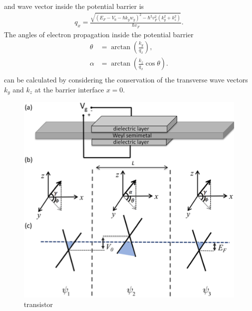     and wave vector inside the potential barrier is
    \begin{align} \label{2eq:inside wavevector}
        q_x = \frac{\sqrt{(E_F-V_0-\hbar k_y w_y)^2 - \hbar^2 v_F^2 (k_y^2 + k_z^2)}}{\hbar v_F}.
    \end{align}
    The angles of electron propagation inside the potential barrier 
    \begin{equation} \label{2eq:angles}
        \begin{aligned}
            \theta &= \arctan{\left(\frac{k_y}{q_x}\right)},\\
            \alpha &= \arctan{\left(\frac{k_z}{q_x} \cos{\theta}\right)}.\\
        \end{aligned}
    \end{equation}
    can be calculated by considering the conservation of the transverse wave vectors $k_y$ and $k_z$ at the barrier interface $x = 0$. 
    \begin{figure}[H]
        \centering
        \includegraphics[width = 0.6\linewidth]{fig/Chap 2/2transistor.png}
        \caption{transistor}
        \label{2fig:transistor}
    \end{figure}


